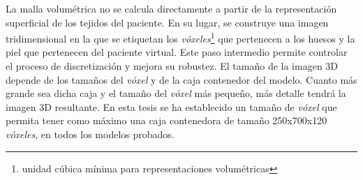La malla volumétrica no se calcula directamente a partir de la representación superficial de los tejidos del paciente. En su lugar, se construye una imagen tridimensional en la que se etiquetan los \emph{vóxeles}\footnote{unidad cúbica mínima para representaciones volumétricas} que pertenecen a los huesos y la piel que pertenecen del paciente virtual. Este paso intermedio permite controlar el proceso de discretización y mejora su robustez.
El tamaño de la imagen 3D depende de los tamaños del \emph{vóxel} y de la caja contenedor del modelo. Cuanto más grande sea dicha caja y el tamaño del \emph{vóxel} más pequeño, más detalle tendrá la imagen 3D resultante. 
En esta tesis se ha establecido un tamaño de \emph{vóxel} que permita tener como máximo una caja contenedora de tamaño 250x700x120 \emph{vóxeles}, en todos los modelos probados.

